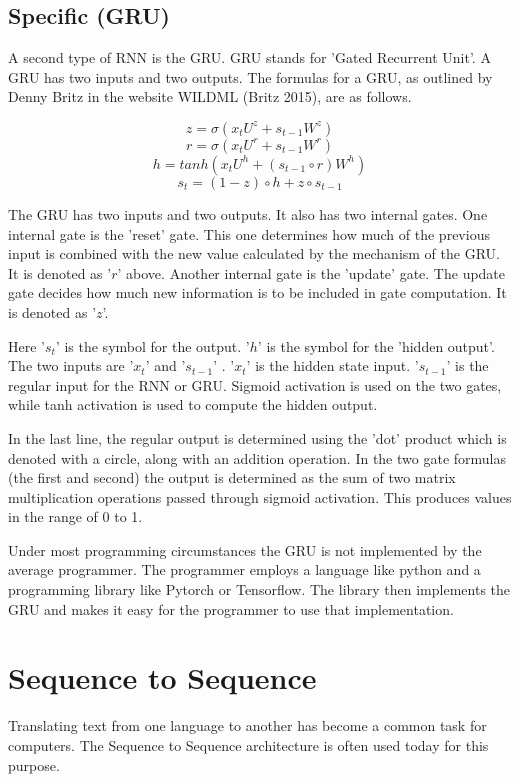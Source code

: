 \subsection*{Specific (GRU)}
A second type of RNN is the \ac{GRU}. GRU stands for 'Gated Recurrent Unit'. A GRU has two inputs and two outputs. The formulas for a GRU, as outlined by Denny Britz in the website WILDML (Britz 2015)\cite{2015Britz}, are as follows.


$$ z =\sigma(x_tU^z + s_{t-1} W^z) $$  
$$ r =\sigma(x_t U^r +s_{t-1} W^r) $$  
$$ h = tanh(x_t U^h + (s_{t-1} \circ r) W^h) $$  
$$ s_t = (1 - z) \circ h + z \circ s_{t-1} $$  


The GRU has two inputs and two outputs. It also has two internal gates. One internal gate is the 'reset' gate. This one determines how much of the previous input is combined with the new value calculated by the mechanism of the GRU. It is denoted as '$r$' above. Another internal gate is the 'update' gate. The update gate decides how much new information is to be included in gate computation. It is denoted as '$z$'.

Here '$ s_t $' is the symbol for the output. '$h$' is the symbol for the 'hidden output'. The two inputs are '$ x_t $' and '$ s_{t-1} $' . '$ x_t $' is the hidden state input. '$ s_{t-1} $' is the regular input for the RNN or GRU. Sigmoid activation is used on the two gates, while tanh activation is used to compute the hidden output.

In the last line, the regular output is determined using the 'dot' product which is denoted with a circle, along with an addition operation. In the two gate formulas (the first and second) the output is determined as the sum of two matrix multiplication operations passed through sigmoid activation. This produces values in the range of 0 to 1.

Under most programming circumstances the GRU is not implemented by the average programmer. The programmer employs a language like python and a programming library like Pytorch or Tensorflow. The library then implements the GRU and makes it easy for the programmer to use that implementation.

\section{Sequence to Sequence}

Translating text from one language to another has become a common task for computers. The Sequence to Sequence architecture is often used today  for this purpose.

